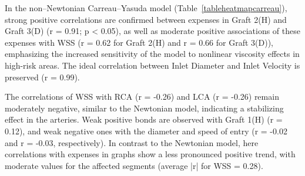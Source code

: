 ﻿\documentclass[12pt,a4paper]{article}
\theoremstyle{definition}
\numberwithin{equation}{section}
\begin{document}
In the non--Newtonian Carreau--Yasuda model (Table~\ref{tableheatmapcarreau}), strong positive correlations are confirmed between expenses in Graft 2(H) and Graft 3(D) (r = 0.91; p < 0.05), as well as moderate positive associations of these expenses with WSS (r = 0.62 for Graft 2(H) and r = 0.66 for Graft 3(D)), emphasizing the increased sensitivity of the model to nonlinear viscosity effects in high-risk areas. The ideal correlation between Inlet Diameter and Inlet Velocity is preserved (r = 0.99).

The correlations of WSS with RCA (r = -0.26) and LCA (r = -0.26) remain moderately negative, similar to the Newtonian model, indicating a stabilizing effect in the arteries. Weak positive bonds are observed with Graft 1(H) (r = 0.12), and weak negative ones with the diameter and speed of entry (r = -0.02 and r = -0.03, respectively). In contrast to the Newtonian model, here correlations with expenses in graphs show a less pronounced positive trend, with moderate values for the affected segments (average |r| for WSS = 0.28).
\end{document}
